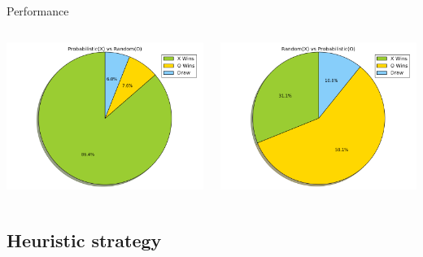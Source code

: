 \documentclass[aspectratio=169]{beamer}
\begin{document}
\begin{frame}{Performance}
	 \begin{columns}
	 	\begin{column}{0.5\textwidth}
	 		\centering
	 		\includegraphics[scale =0.35]{probVSrandom.png}
	 	\end{column}
	 	\begin{column}{0.5\textwidth}
	 		\centering
	 		\includegraphics[scale =0.35]{randVSprob.png}
	 	\end{column}
	 \end{columns}
	
\end{frame}

\subsection{Heuristic strategy}
\end{document}
